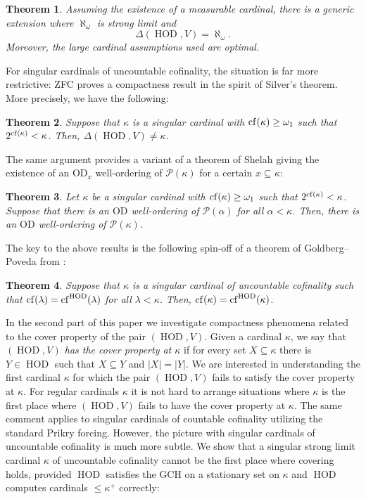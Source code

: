 \documentclass[11pt]{amsart}
\newtheorem{theorem}{Theorem}[section]
\theoremstyle{definition}
\theoremstyle{remark}
\DeclareMathOperator{\HOD}{HOD}
\newcommand{\cf}{{\rm cf}}
\def\s{\subseteq}
\begin{document}
\begin{theorem}\label{thm: alephomega}
    Assuming the existence of a measurable cardinal, there is a  generic extension where $\aleph_\omega$ is strong limit and $$\Delta(\HOD, V)=\aleph_\omega.$$
    Moreover, the large cardinal assumptions used are optimal.
\end{theorem}
For singular cardinals of uncountable cofinality, the situation is far more restrictive:
ZFC proves a compactness result in the spirit of Silver's theorem. More precisely, we have
the following:
 
\begin{theorem}\label{thm: compactness}
 Suppose that $\kappa$ is a singular cardinal with $\cf(\kappa)\geq \omega_1$ such that $2^{\cf(\kappa)}<\kappa$. Then, $\Delta(\HOD, V)\neq \kappa$.
\end{theorem}
The same argument provides a variant of a theorem of Shelah  \cite{ShelahHOD} giving the existence of an $\mathrm{OD}_x$ well-ordering of $\mathcal{P}(\kappa)$ for a certain $x\s \kappa$:
\begin{theorem}\label{thm: shelah variant}
 Let $\kappa$ be a singular cardinal with $\cf(\kappa)\geq \omega_1$ such that $2^{\cf(\kappa)}<\kappa$. Suppose that there is an $\mathrm{OD}$ well-ordering of $\mathcal{P}(\alpha)$ for all $\alpha < \kappa$. Then, there is an $\mathrm{OD}$ well-ordering of $\mathcal{P}(\kappa)$.    
\end{theorem}
The key to the above results is the following spin-off of a theorem of Goldberg--Poveda from \cite{GolPov}:
\begin{theorem}\label{thm: spinoffGP}
 Suppose that $\kappa$ is a singular cardinal of uncountable cofinality such that $\cf(\lambda)=\cf^{\HOD}(\lambda)$ for all $\lambda < \kappa$. Then, $\cf(\kappa)=\cf^{\HOD}(\kappa)$.   
\end{theorem}
 
In the second part of this paper we  investigate compactness phenomena related to the cover property of the pair $(\HOD, V)$. Given a cardinal $\kappa$, we say that \emph{$(\HOD, V)$ has the cover property at $\kappa$} if for  every set $X \s \kappa$ there is $Y\in \HOD$ such that $X\s Y$ and $|X|=|Y|$. We are interested in understanding the first cardinal $\kappa$ for which the pair $(\HOD, V)$ fails to satisfy the cover property at $\kappa$. {For regular cardinals $\kappa$ it is not hard to arrange situations where $\kappa$ is the first place where $(\HOD, V)$ fails to have the cover property at $\kappa$.} The same comment applies to singular cardinals of countable cofinality utilizing the standard Prikry forcing.  However, the picture with singular cardinals of uncountable cofinality is much more subtle. We show  that a singular strong limit cardinal $\kappa$ of uncountable cofinality cannot be the first place where covering holds, provided $\HOD$ satisfies the GCH on a stationary set on $\kappa$ and $\HOD$ computes cardinals ${\leq}\kappa^+$ correctly:
 
\end{document}
